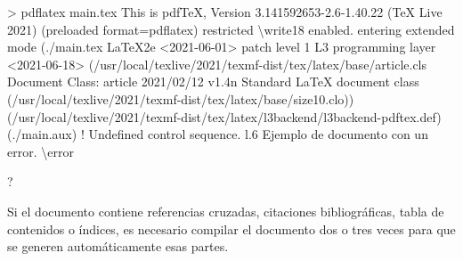 \documentclass[
  a4paper,
]{scrreport}
\newenvironment{Shaded}{\begin{snugshade}}{\end{snugshade}}
\newcommand{\DataTypeTok}[1]{\textcolor[rgb]{0.68,0.00,0.00}{#1}}
\newcommand{\ErrorTok}[1]{\textcolor[rgb]{0.68,0.00,0.00}{#1}}
\newcommand{\ExtensionTok}[1]{\textcolor[rgb]{0.00,0.23,0.31}{#1}}
\newcommand{\KeywordTok}[1]{\textcolor[rgb]{0.00,0.23,0.31}{#1}}
\newcommand{\NormalTok}[1]{\textcolor[rgb]{0.00,0.23,0.31}{#1}}
\newcommand{\OperatorTok}[1]{\textcolor[rgb]{0.37,0.37,0.37}{#1}}
\newcommand{\OtherTok}[1]{\textcolor[rgb]{0.00,0.23,0.31}{#1}}
\newcommand{\VariableTok}[1]{\textcolor[rgb]{0.07,0.07,0.07}{#1}}
\begin{document}
\begin{Shaded}
\begin{Highlighting}[]
\OperatorTok{\textgreater{}}\NormalTok{ pdflatex }\ExtensionTok{main.tex}
\ExtensionTok{This}\NormalTok{ is pdfTeX, Version 3.141592653{-}2.6{-}1.40.22 }\ErrorTok{(}\ExtensionTok{TeX}\NormalTok{ Live 2021}\KeywordTok{)} \KeywordTok{(}\ExtensionTok{preloaded} 
\VariableTok{format}\OperatorTok{=}\NormalTok{pdflatex}\KeywordTok{)} \ExtensionTok{restricted} \DataTypeTok{\textbackslash{}w}\NormalTok{rite18 enabled.}
\ExtensionTok{entering}\NormalTok{ extended mode}
\KeywordTok{(}\ExtensionTok{./main.tex}
\ExtensionTok{LaTeX2e} \OperatorTok{\textless{}}\NormalTok{2021{-}06{-}01}\OperatorTok{\textgreater{}}\NormalTok{ patch level 1}
\ExtensionTok{L3}\NormalTok{ programming layer }\OperatorTok{\textless{}}\NormalTok{2021{-}06{-}18}\OperatorTok{\textgreater{}}
\KeywordTok{(}\ExtensionTok{/usr/local/texlive/2021/texmf{-}dist/tex/latex/base/article.cls}
\ExtensionTok{Document}\NormalTok{ Class: article 2021/02/12 v1.4n Standard LaTeX document class}
\KeywordTok{(}\ExtensionTok{/usr/local/texlive/2021/texmf{-}dist/tex/latex/base/size10.clo}\KeywordTok{))}
\KeywordTok{(}\ExtensionTok{/usr/local/texlive/2021/texmf{-}dist/tex/latex/l3backend/l3backend{-}pdftex.def}\KeywordTok{)}
\KeywordTok{(}\ExtensionTok{./main.aux}\KeywordTok{)}
\OtherTok{! }\ExtensionTok{Undefined}\NormalTok{ control sequence.}
\ExtensionTok{l.6}\NormalTok{ Ejemplo de documento con un error. }\DataTypeTok{\textbackslash{}e}\NormalTok{rror}
                                             
\ExtensionTok{?} 
\end{Highlighting}
\end{Shaded}

\begin{tcolorbox}[enhanced jigsaw, bottomrule=.15mm, leftrule=.75mm, opacityback=0, titlerule=0mm, bottomtitle=1mm, colbacktitle=quarto-callout-warning-color!10!white, arc=.35mm, toprule=.15mm, colframe=quarto-callout-warning-color-frame, title=\textcolor{quarto-callout-warning-color}{\faExclamationTriangle}\hspace{0.5em}{Advertencia}, coltitle=black, colback=white, breakable, toptitle=1mm, rightrule=.15mm, left=2mm, opacitybacktitle=0.6]

Si el documento contiene referencias cruzadas, citaciones
bibliográficas, tabla de contenidos o índices, es necesario compilar el
documento dos o tres veces para que se generen automáticamente esas
partes.

\end{tcolorbox}
\end{document}
